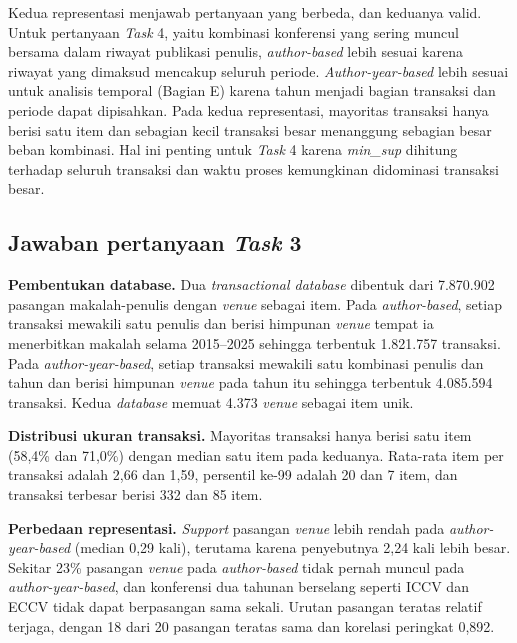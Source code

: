 Kedua representasi menjawab pertanyaan yang berbeda, dan keduanya valid. Untuk pertanyaan \textit{Task} 4, yaitu kombinasi konferensi yang sering muncul bersama dalam riwayat publikasi penulis, \textit{author-based} lebih sesuai karena riwayat yang dimaksud mencakup seluruh periode. \textit{Author-year-based} lebih sesuai untuk analisis temporal (Bagian E) karena tahun menjadi bagian transaksi dan periode dapat dipisahkan. Pada kedua representasi, mayoritas transaksi hanya berisi satu item dan sebagian kecil transaksi besar menanggung sebagian besar beban kombinasi. Hal ini penting untuk \textit{Task} 4 karena \textit{min\_sup} dihitung terhadap seluruh transaksi dan waktu proses kemungkinan didominasi transaksi besar.

\subsection{Jawaban pertanyaan \textit{Task} 3}
\label{sec:jawab-t3}
\textbf{Pembentukan database.} Dua \textit{transactional database} dibentuk dari 7.870.902 pasangan makalah-penulis dengan \textit{venue} sebagai item. Pada \textit{author-based}, setiap transaksi mewakili satu penulis dan berisi himpunan \textit{venue} tempat ia menerbitkan makalah selama 2015--2025 sehingga terbentuk 1.821.757 transaksi. Pada \textit{author-year-based}, setiap transaksi mewakili satu kombinasi penulis dan tahun dan berisi himpunan \textit{venue} pada tahun itu sehingga terbentuk 4.085.594 transaksi. Kedua \textit{database} memuat 4.373 \textit{venue} sebagai item unik.

\textbf{Distribusi ukuran transaksi.} Mayoritas transaksi hanya berisi satu item (58,4\% dan 71,0\%) dengan median satu item pada keduanya. Rata-rata item per transaksi adalah 2,66 dan 1,59, persentil ke-99 adalah 20 dan 7 item, dan transaksi terbesar berisi 332 dan 85 item.

\textbf{Perbedaan representasi.} \textit{Support} pasangan \textit{venue} lebih rendah pada \textit{author-year-based} (median 0,29 kali), terutama karena penyebutnya 2,24 kali lebih besar. Sekitar 23\% pasangan \textit{venue} pada \textit{author-based} tidak pernah muncul pada \textit{author-year-based}, dan konferensi dua tahunan berselang seperti ICCV dan ECCV tidak dapat berpasangan sama sekali. Urutan pasangan teratas relatif terjaga, dengan 18 dari 20 pasangan teratas sama dan korelasi peringkat 0,892.

